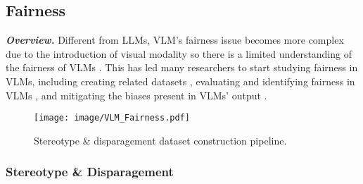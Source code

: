\subsection{Fairness}
\label{sec:VLM_fairness}

\textbf{\textit{Overview.}} Different from LLMs, VLM's fairness issue becomes more complex due to the introduction of visual modality so there is a limited understanding of the fairness of VLMs \cite{parraga2023fairness, adewumi2024fairness, lee2023survey}. This has led many researchers to start studying fairness in VLMs, including creating related datasets \cite{adewumi2024fairness, zhou2022vlstereoset, zhou2022vlstereoset, abdollahi2024gabinsight, fraser2024examining, Howard_2024_CVPR}, evaluating and identifying fairness in VLMs \cite{wu2024evaluating, adewumi2024fairness, teo2024measuring, xiao2024genderbias, lee2024more, abdollahi2024gabinsight, ananthram2024see, janghorbani2023multimodal, fraser2024examining, chen2024quantifying}, and mitigating the biases present in VLMs' output \cite{D'Inca_2024_WACV, Seth_2023_CVPR}. 


\begin{figure}[H]
    \centering
    \texttt{[image: image/VLM\_Fairness.pdf]}
    \caption{Stereotype \& disparagement dataset construction pipeline.}
    \label{fig:VLM_fairness_pipeline}
    \vspace{-15pt}
\end{figure}


\subsubsection{Stereotype \& Disparagement}

